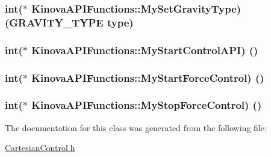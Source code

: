 \subsubsection[{\texorpdfstring{My\+Set\+Gravity\+Type}{MySetGravityType}}]{\setlength{\rightskip}{0pt plus 5cm}int($\ast$ Kinova\+A\+P\+I\+Functions\+::\+My\+Set\+Gravity\+Type) (G\+R\+A\+V\+I\+T\+Y\+\_\+\+T\+Y\+PE type)}\hypertarget{classKinovaAPIFunctions_ac359d0722318b7b30b841d6e3542d55b}{}\label{classKinovaAPIFunctions_ac359d0722318b7b30b841d6e3542d55b}
\subsubsection[{\texorpdfstring{My\+Start\+Control\+A\+PI}{MyStartControlAPI}}]{\setlength{\rightskip}{0pt plus 5cm}int($\ast$ Kinova\+A\+P\+I\+Functions\+::\+My\+Start\+Control\+A\+PI) ()}\hypertarget{classKinovaAPIFunctions_a0ed40fabec0007d019c516ce460cf646}{}\label{classKinovaAPIFunctions_a0ed40fabec0007d019c516ce460cf646}
\subsubsection[{\texorpdfstring{My\+Start\+Force\+Control}{MyStartForceControl}}]{\setlength{\rightskip}{0pt plus 5cm}int($\ast$ Kinova\+A\+P\+I\+Functions\+::\+My\+Start\+Force\+Control) ()}\hypertarget{classKinovaAPIFunctions_aedcd71f51df6f2983a1b25b46c6bf14c}{}\label{classKinovaAPIFunctions_aedcd71f51df6f2983a1b25b46c6bf14c}
\subsubsection[{\texorpdfstring{My\+Stop\+Force\+Control}{MyStopForceControl}}]{\setlength{\rightskip}{0pt plus 5cm}int($\ast$ Kinova\+A\+P\+I\+Functions\+::\+My\+Stop\+Force\+Control) ()}\hypertarget{classKinovaAPIFunctions_a893c0dc6f8834ddd3a97ee8ea5c6d152}{}\label{classKinovaAPIFunctions_a893c0dc6f8834ddd3a97ee8ea5c6d152}


The documentation for this class was generated from the following file\+:\begin{DoxyCompactItemize}
\item 
\hyperlink{CartesianControl_8h}{Cartesian\+Control.\+h}\end{DoxyCompactItemize}
